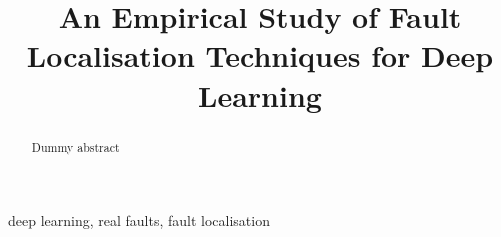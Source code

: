 \documentclass[conference]{IEEEtran}
\begin{document}
\title{An Empirical Study of Fault Localisation Techniques for Deep Learning}

\makeatletter
\newcommand{\linebreakand}{%
  \end{@IEEEauthorhalign}
  \hfill\mbox{}\par
  \mbox{}\hfill\begin{@IEEEauthorhalign}
}
\makeatother

 \author{\author{}}

\maketitle

\begin{abstract}
Dummy abstract

\end{abstract}

\begin{IEEEkeywords}
deep learning, real faults, fault localisation
\end{IEEEkeywords}












%
%

\balance


\vspace{12pt}
\end{document}
